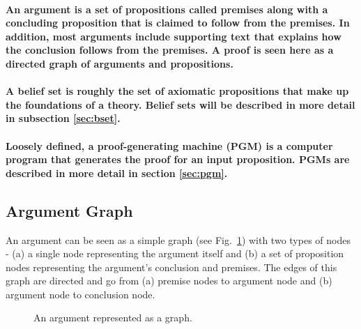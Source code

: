 \documentclass[runningheads]{llncs}
\begin{document}
\paragraph{An \textbf{argument} is a set of propositions called premises along with a concluding proposition that is claimed to follow from the premises. In addition, most arguments include supporting text that explains how the conclusion follows from the premises. A proof is seen here as a directed graph of arguments and propositions.}

\paragraph{A \textbf{belief set} is roughly the set of axiomatic propositions that make up the foundations of a theory. Belief sets will be described in more detail in subsection \ref{sec:bset}.}

\paragraph{Loosely defined, a \textbf{proof-generating machine} (PGM) is a computer program that generates the proof for an input proposition. PGMs are described in more detail in section \ref{sec:pgm}.}

\subsection{Argument Graph}
An argument can be seen as a simple graph (see Fig.~\ref{argument}) with two types of nodes - (a) a single node representing the argument itself and (b) a set of proposition nodes representing the argument's conclusion and premises. The edges of this graph are directed and go from (a) premise nodes to argument node and (b) argument node to conclusion node.

\begin{figure}[!ht]
\begin{center}
\caption{An argument represented as a graph.}
\label{argument}
\end{center}
\end{figure}
\end{document}
